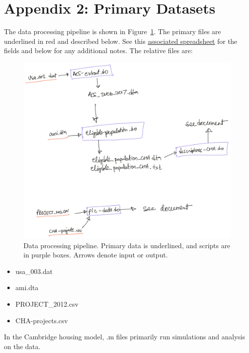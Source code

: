 \documentclass[11pt]{article}
\begin{document}
\section{Appendix 2: Primary Datasets}
The data processing pipeline is shown in Figure~\ref{fig:datapipeline}. The primary files are underlined in red  and described below. See this \href{https://docs.google.com/spreadsheets/d/1rT5IQdjf1eXFhCbJFr7dV0yZLzTJhNmbBcI5qajiMEw/edit#gid=555949214}{associated  spreadsheet} for the fields and below for any additional notes. The relative files are:

\begin{figure}
    \centering
    \includegraphics[width=1\linewidth]{doc/data_processing_pipeline.png}
    \caption{Data processing pipeline. Primary data is underlined, and scripts are in purple boxes. Arrows denote input or output.}
    \label{fig:datapipeline}
\end{figure}
\begin{itemize}
    \item usa\_003.dat
    \item ami.dta
    \item PROJECT\_2012.csv
    \item CHA-projects.csv
\end{itemize}
In the Cambridge housing model, .m files primarily run simulations and analysis on the data. 

\newpage

 
\end{document}
